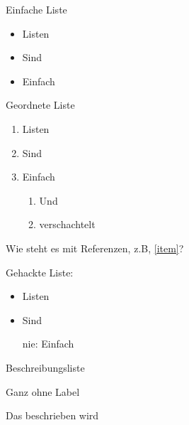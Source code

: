 \documentclass[a4paper]{amsart}
\begin{document}
Einfache Liste

\begin{itemize}
    \item Listen
    \item Sind
    \item Einfach
\end{itemize}
  

Geordnete Liste

\begin{enumerate}
    \item Listen
    \item Sind
    \item \label{item} Einfach 
    \begin{enumerate}
        \item Und
        \item verschachtelt
    \end{enumerate}
\end{enumerate}

Wie steht es mit Referenzen, z.B, \ref{item}?

Gehackte Liste:

\begin{itemize}
    \item Listen
    \item Sind
    \item[nie:] Einfach
\end{itemize}

Beschreibungsliste

\begin{description}
    \item Ganz ohne Label
    \item[Mit Label] Das beschrieben wird
 \end{description}
\end{document}
